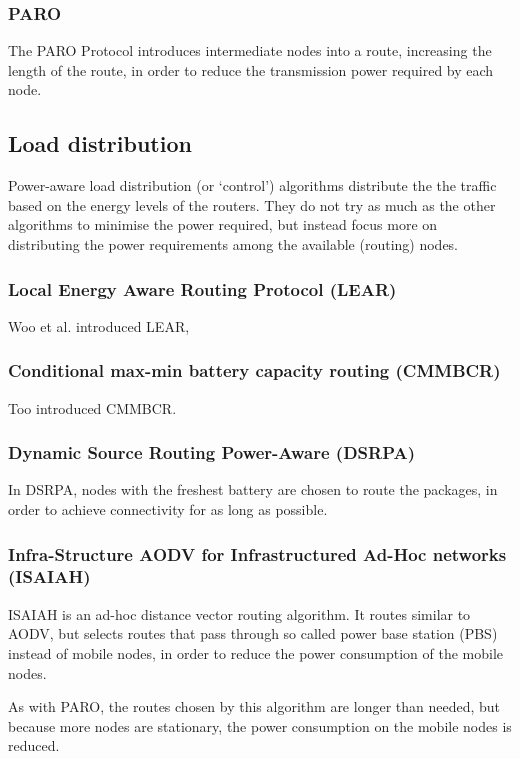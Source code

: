 \documentclass[conference]{IEEEtran}
\begin{document}
\subsubsection{PARO}
The PARO Protocol\cite{gomez2003paro} introduces intermediate nodes into a
route, increasing the length of the route, in order to reduce the transmission
power required by each node.

\subsection{Load distribution}
Power-aware load distribution (or `control') algorithms distribute the the
traffic based on the energy levels of the routers.
They do not try as much as the other algorithms to minimise the power required,
but instead focus more on distributing the power requirements among the available (routing) nodes.

\subsubsection{Local Energy Aware Routing Protocol (LEAR)}
Woo et al. introduced LEAR\cite{woo2001non},

\subsubsection{Conditional max-min battery capacity routing (CMMBCR)}
Too introduced CMMBCR\cite{toh2001maximum}.

\subsubsection{Dynamic Source Routing Power-Aware (DSRPA)}
In DSRPA\cite{djenouri2006dynamic}, nodes with the freshest battery are
chosen to route the packages, in order to achieve connectivity for as
long as possible.\cite{alotaibi2012survey}

\subsubsection{Infra-Structure AODV for Infrastructured Ad-Hoc networks (ISAIAH)}
ISAIAH\cite{lindgren2002infrastructured} is an ad-hoc distance vector routing
algorithm. It routes similar to AODV, but selects routes that pass through
so called power base station (PBS) instead of mobile nodes, in order to reduce
the power consumption of the mobile nodes.

As with PARO, the routes chosen by this algorithm are longer than needed, but
because more nodes are stationary, the power consumption on the mobile nodes
is reduced.
\end{document}
